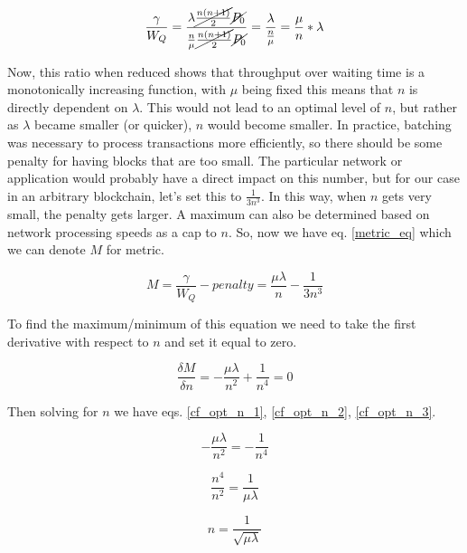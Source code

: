 \documentclass[conference]{IEEEtran}
\begin{document}
\begin{equation}
\frac{\gamma}{W_Q}=\frac{\lambda\cancel{\frac{n(n+1)}{2}}\cancel{P_0}}{\frac{n}{\mu}\cancel{\frac{n(n+1)}{2}}\cancel{P_0}}=\frac{\lambda}{\frac{n}{\mu}}=\frac{\mu}{n}\ast\lambda\label{ratio_eq}
\end{equation}

Now, this ratio when reduced shows that throughput over waiting time is a monotonically increasing function, 
with $\mu$ being fixed this means that $n$ is directly dependent on $\lambda$. This would not lead to an optimal 
level of $n$, but rather as $\lambda$ became smaller (or quicker), $n$ would become smaller. In practice, 
batching was necessary to process transactions more efficiently, so there should be some penalty for having blocks 
that are too small. The particular network or application would probably have a direct impact on this number, but
for our case in an arbitrary blockchain, let's set this to $\frac{1}{3n^3}$. In this way, when $n$ gets very small, 
the penalty gets larger. A maximum can also be determined based on network processing speeds as a cap to 
$n$. So, now we have eq. \ref{metric_eq} which we can denote $M$ for metric.

\begin{equation}
M=\frac{\gamma}{W_Q}-penalty=\frac{\mu\lambda}{n}-\frac{1}{3n^3}\label{metric_eq}
\end{equation}

To find the maximum/minimum of this equation we need to take the first derivative with respect to $n$ 
and set it equal to zero. 

\begin{equation}
\frac{\delta M}{\delta n}=-\frac{\mu\lambda}{n^2}+\frac{1}{n^4}=0\label{metric_deriv}
\end{equation}

Then solving for $n$ we have eqs. \ref{cf_opt_n_1}, \ref{cf_opt_n_2}, \ref{cf_opt_n_3}.

\begin{equation}
-\frac{\mu\lambda}{n^2}=-\frac{1}{n^4}\label{cf_opt_n_1}
\end{equation}

\begin{equation}
\frac{n^4}{n^2}=\frac{1}{\mu\lambda}\label{cf_opt_n_2}
\end{equation}

\begin{equation}
n=\frac{1}{\sqrt{\mu\lambda}}\label{cf_opt_n_3}
\end{equation}
\end{document}
